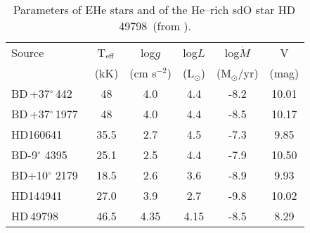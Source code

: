 \documentclass[USenglish,twocolumn]{article}
\def\BDone{BD\,+37$^\circ$\,442}
\def\BDtwo{BD\,+37$^\circ$\,1977}
\def\HDone{HD\,49798}
\begin{document}
\begin{table}[htbp]
\caption{\footnotesize{Parameters of EHe stars and of the He--rich sdO star \HDone\ (from \citet{Hamann10}).}}\label{EHe_stars}
\vspace{-0.5cm}
\begin{scriptsize}
\begin{center}
\begin{tabular}{lccccc} \hline \hline
Source			& T$_{\rm eff}$	& log$g$	& log$L$	& log$\dot M$		& V	\\
			& (kK)		& (cm s$^{-2}$)	& (L$_{\odot}$)	& (M$_{\odot}$/yr)	& (mag)	\\ \hline
\BDone\			& 48		& 4.0		& 4.4		& -8.2			& 10.01	\\
\BDtwo\			& 48		& 4.0		& 4.4		& -8.5			& 10.17	\\ \hline
HD160641		& 35.5		& 2.7		& 4.5		& -7.3			& 9.85	\\
BD-9$^\circ$ 4395	& 25.1		& 2.5		& 4.4		& -7.9			& 10.50	\\
BD+10$^\circ$ 2179	& 18.5		& 2.6		& 3.6		& -8.9			& 9.93	\\
HD144941		& 27.0		& 3.9		& 2.7		& -9.8			& 10.02	\\ \hline
\HDone\			& 46.5		& 4.35		& 4.15 		& -8.5			& 8.29	\\ \hline
\end{tabular}
\end{center}
\end{scriptsize}
\vspace{-0.5cm}
\end{table}
\end{document}
